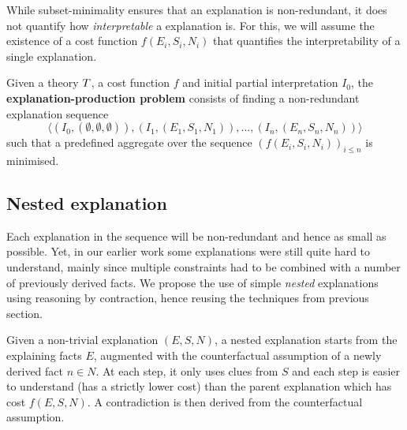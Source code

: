 While subset-minimality ensures that an explanation is non-redundant, it does not quantify how \textit{interpretable} a explanation is. 
For this, we will assume the existence of a cost function $f(E_i,S_i,N_i)$ that quantifies the interpretability of a single explanation.

Given a theory $T$, a cost function $f$ and initial partial interpretation $I_0$, the \textbf{explanation-production problem} consists of finding a non-redundant explanation sequence
\[\langle(I_0,(\emptyset,\emptyset,\emptyset)), (I_1,(E_1,S_1,N_1)), \dots ,(I_n,(E_n,S_n,N_n))\rangle\]
such that a predefined aggregate over the sequence $\left(f(E_i,S_i,N_i)\right)_{i\leq n}$ is minimised.

\subsection{Nested explanation}
Each explanation in the sequence will be non-redundant and hence as small as possible. Yet, in our earlier work some explanations were still quite hard to understand, mainly since multiple constraints had to be combined with a number of previously derived facts. 
We propose the use of simple \textit{nested} explanations using reasoning by contraction, hence reusing the techniques from previous section. 

Given a non-trivial explanation $(E,S,N)$, a nested explanation starts from the explaining facts $E$, augmented with the counterfactual assumption of a newly derived fact $n \in N$. At each step, it only uses clues from $S$ and each step is easier to understand (has a strictly lower cost) than the parent explanation which has cost $f(E,S,N)$. A contradiction is then derived from the counterfactual assumption.

